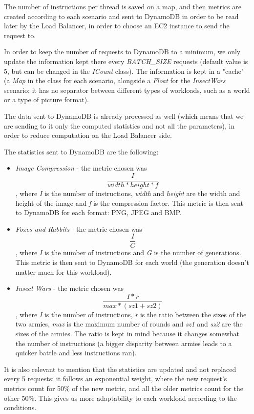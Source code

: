 \documentclass{article}
\begin{document}
The number of instructions per thread is saved on a map, and then metrics are
created according to each scenario and sent to DynamoDB in order to be read
later by the Load Balancer, in order to choose an EC2 instance to send the
request to.

In order to keep the number of requests to DynamoDB to a minimum, we only
update the information kept there every \textit{BATCH\_SIZE} requests (default
value is 5, but can be changed in the \textit{ICount} class). The information is
kept in a "cache" (a \textit{Map} in the class for each scenario, alongside a
\textit{Float} for the \textit{InsectWars} scenario: it has no separator between
different types of workloads, such as a world or a type of picture format).

The data sent to DynamoDB is already processed as well (which means that we are
sending to it only the computed statistics and not all the parameters), in order
to reduce computation on the Load Balancer side.

The statistics sent to DynamoDB are the following:

\begin{itemize}
    \item \textit{Image Compression} - the metric chosen was
        \[\frac{I}{width*height*f}\], where \textit{I} is the number of
        instructions, \textit{width} and \textit{height} are the width and
        height of the image and \textit{f} is the compression factor. This
        metric is then sent to DynamoDB for each format: PNG, JPEG and BMP. 
    \item \textit{Foxes and Rabbits} - the metric chosen was \[\frac{I}{G}\], 
        where \textit{I} is the number of instructions and \textit{G} is the
        number of generations. This metric is then sent to DynamoDB for each
        world (the generation doesn't matter much for this workload).
    \item \textit{Insect Wars} - the metric chosen was
        \[\frac{I*r}{max*(sz1+sz2)}\], where \textit{I} is the number of
        instructions, \textit{r} is the ratio between the sizes of the two
        armies, \textit{max} is the maximum number of rounds and \textit{sz1}
        and \textit{sz2} are the sizes of the armies. The ratio is kept in mind
        because it changes somewhat the number of instructions (a bigger
        disparity between armies leads to a quicker battle and less instructions
        ran).
\end{itemize}

It is also relevant to mention that the statistics are updated and not replaced
every 5 requests: it follows an exponential weight, where the new request's
metrics count for 50\% of the new metric, and all the older metrics count for
the other 50\%. This gives us more adaptability to each workload according to
the conditions.
\end{document}
